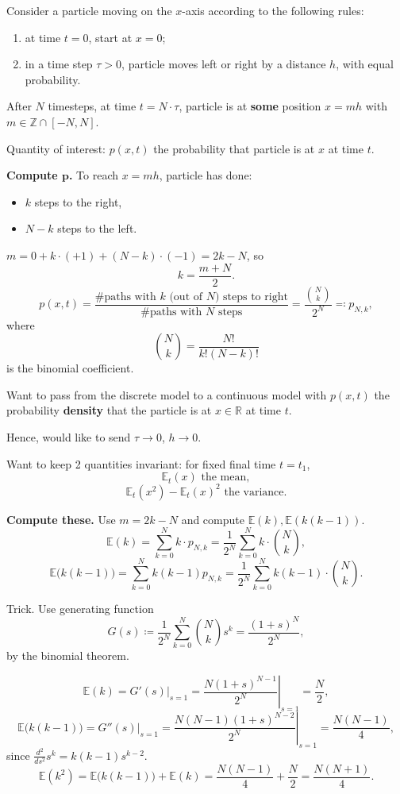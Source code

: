 \documentclass[12pt]{article}
\theoremstyle{definition}
\begin{document}
Consider a particle moving on the $x$-axis according to the following rules:
\begin{enumerate}[label=(\arabic*)]
\item at time $t=0$, start at $x=0$;
\item\label{distance_step} in a time step $\tau>0$, particle moves left or right by a distance $h$, with equal probability.
\end{enumerate}

After $N$ timesteps, at time $t=N\cdot\tau$, particle is at \textbf{some} position $x=mh$ with $m\in\mathbb Z\cap[-N,N]$.

Quantity of interest: $p(x,t)$ the probability that particle is at $x$ at time $t$.

\textbf{Compute $\boldsymbol p$.} To reach $x=mh$, particle has done:
\begin{itemize}
\item $k$ steps to the right,
\item $N-k$ steps to the left.
\end{itemize}
$m=0+k\cdot(+1)+(N-k)\cdot(-1)=2k-N$, so
\[k=\frac{m+N}2.\]
\[p(x,t)=\frac{\text{\# paths with }k\text{ (out of }N\text{) steps to right}}{\text{\# paths with }N\text{ steps}}=\frac{\binom Nk}{2^N}\eqqcolon p_{N,k},\]
where
\[\binom Nk=\frac{N!}{k!(N-k)!}\]
is the binomial coefficient.

Want to pass from the discrete model to a continuous model with $p(x,t)$ the probability \textbf{density} that the particle is at $x\in\mathbb R$ at time $t$.

Hence, would like to send $\tau\to0$, $h\to0$.

Want to keep 2 quantities invariant: for fixed final time $t=t_1$,
\[\mathbb E_t(x)\text{ the mean},\]
\[\mathbb E_t(x^2)-\mathbb E_t(x)^2\text{ the variance}.\]

\textbf{Compute these.} Use $m=2k-N$ and compute $\mathbb E(k),\mathbb E(k(k-1))$.
\[\mathbb E(k)=\sum_{k=0}^Nk\cdot p_{N,k}=\frac1{2^N}\sum_{k=0}^Nk\cdot\binom Nk,\]
\[\mathbb E\big(k(k-1)\big)=\sum_{k=0}^Nk(k-1)p_{N,k}=\frac1{2^N}\sum_{k=0}^Nk(k-1)\cdot\binom Nk.\]

Trick. Use generating function
\[G(s)\coloneqq\frac1{2^N}\sum_{k=0}^N\binom Nks^k=\frac{(1+s)^N}{2^N},\]
by the binomial theorem.

\[\mathbb E(k)=G'(s)|_{s=1}=\left.\frac{N(1+s)^{N-1}}{2^N}\right|_{s=1}=\frac N2,\]
\[\mathbb E\big(k(k-1)\big)=G''(s)|_{s=1}=\left.\frac{N(N-1)(1+s)^{N-2}}{2^N}\right|_{s=1}=\frac{N(N-1)}4,\]
since $\frac{d^2}{ds^2}s^k=k(k-1)s^{k-2}$.
\[\mathbb E(k^2)=\mathbb E\big(k(k-1)\big)+\mathbb E(k)=\frac{N(N-1)}4+\frac N2=\frac{N(N+1)}4.\]
\end{document}
